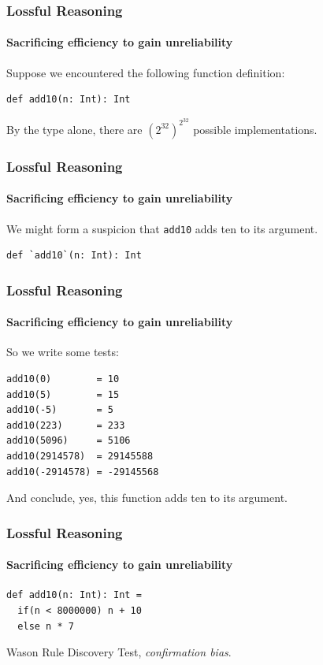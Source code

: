 \begin{frame}[fragile]
\frametitle{Lossful Reasoning}
\framesubtitle{Sacrificing efficiency to gain unreliability}
Suppose we encountered the following function definition:
\begin{lstlisting}[style=scala]
def add10(n: Int): Int
\end{lstlisting}
By the type alone, there are {$({2^{32}})^{2^{32}}$} possible implementations.
\end{frame}

\begin{frame}[fragile]
\frametitle{Lossful Reasoning}
\framesubtitle{Sacrificing efficiency to gain unreliability}
We might form a suspicion that \lstinline[style=scala]$add10$ adds ten to its argument.
\begin{lstlisting}[style=scala]
def `add10`(n: Int): Int
\end{lstlisting}
\end{frame}

\begin{frame}[fragile]
\frametitle{Lossful Reasoning}
\framesubtitle{Sacrificing efficiency to gain unreliability}
So we write some tests:
\begin{lstlisting}[style=scala]
add10(0)        = 10
add10(5)        = 15
add10(-5)       = 5
add10(223)      = 233
add10(5096)     = 5106
add10(2914578)  = 29145588
add10(-2914578) = -29145568
\end{lstlisting}
And conclude, yes, this function adds ten to its argument.
\end{frame}

\begin{frame}[fragile]
\frametitle{Lossful Reasoning}
\framesubtitle{Sacrificing efficiency to gain unreliability}
\begin{lstlisting}[style=scala]
def add10(n: Int): Int =
  if(n < 8000000) n + 10
  else n * 7
\end{lstlisting}
Wason Rule Discovery Test, \emph{confirmation bias\cite{gale2002does}}.
\end{frame}

